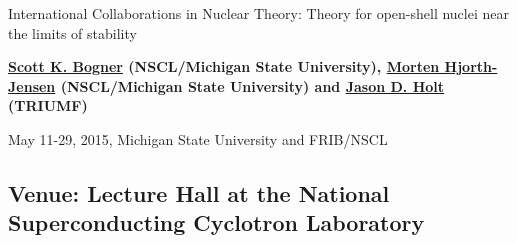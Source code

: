 \documentclass[%
twoside,                 %
final,                   %
10pt]{article}
\begin{document}






\thispagestyle{empty}

\begin{center}
{\LARGE\bf
\begin{spacing}{1.25}
International Collaborations in Nuclear Theory: Theory for open-shell nuclei near the limits of stability
\end{spacing}
}
\end{center}


\begin{center}
{\bf \href{{http://nscl.msu.edu/directory/bogner.html}}{Scott K. Bogner} (NSCL/Michigan State University), \href{{https://www.pa.msu.edu/profile/hjensen}}{Morten Hjorth-Jensen} (NSCL/Michigan State University) and \href{{http://www.triumf.ca/jason-d-holt}}{Jason D. Holt} (TRIUMF)${}^{}$} \\ [0mm]
\end{center}

    \begin{center}
\end{center}
    


\begin{center} %
May 11-29, 2015, Michigan State University and FRIB/NSCL
\end{center}

\vspace{1cm}


\subsection*{Venue: Lecture Hall at the National Superconducting Cyclotron Laboratory}

\end{document}
